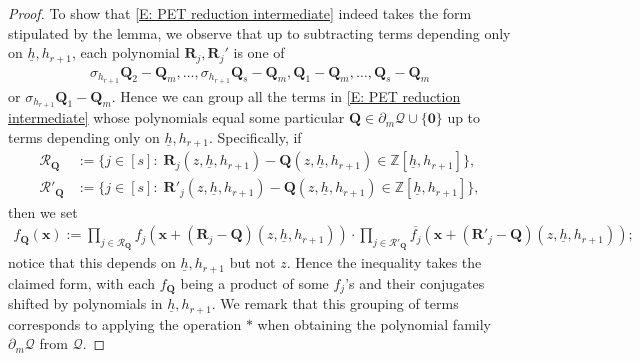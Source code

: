 \documentclass[11pt]{amsart}
\theoremstyle{definition}
\newcommand{\Z}{{\mathbb Z}}
\newcommand{\CQ}{{\mathcal Q}}
\newcommand{\bq}{{\mathbf{Q}}}
\newcommand{\q}{{\mathbf{Q}}}
\newcommand{\bx}{{\mathbf{x}}}
\newcommand{\uh}{{\underline{h}}}
\begin{document}
\begin{proof}
     To show that \eqref{E: PET reduction intermediate} indeed takes the form stipulated by the lemma, we observe that up to subtracting terms depending only on $\uh, h_{r+1}$, each polynomial $\mathbf{R}_j, \mathbf{R}_j'$ is one of
        \begin{align}\label{E: polys after vdC}
            \sigma_{h_{r+1}}{\q}_2-{\q}_m, \ldots, \sigma_{h_{r+1}}{\q}_s - {\q}_m, {\q}_1-{\q}_m, \ldots,  {\q}_s-{\q}_m
        \end{align}
        or $\sigma_{h_{r+1}}{\q}_1-{\q}_m$. Hence we can group all the terms in \eqref{E: PET reduction intermediate} whose polynomials equal some particular $\bq\in\partial_m \CQ\cup\{\mathbf{0}\}$ up to terms depending only on $\uh, h_{r+1}$. Specifically, if 
        \begin{align*}
            \mathcal{R}_\bq &:=\{j\in[s]:\; \mathbf{R}_j(z,\uh, h_{r+1}) - \bq(z, \uh, h_{r+1})\in\Z[\uh,h_{r+1}]\},\\
            \mathcal{R}'_\bq &:=\{j\in[s]:\; \mathbf{R}'_j(z,\uh, h_{r+1}) - \bq(z, \uh, h_{r+1})\in\Z[\uh,h_{r+1}]\},
        \end{align*}
        then we set 
        \begin{align*}
            f_\bq(\bx) := \prod_{j\in \mathcal{R}_\bq}f_j(\bx + (\mathbf{R}_j-\bq)(z,\uh, h_{r+1}))\cdot \prod_{j\in \mathcal{R}'_\bq}\overline{f_j}(\bx + (\mathbf{R}'_{j}-\bq)(z, \uh, h_{r+1}));
        \end{align*}
        notice that this depends on $\uh, h_{r+1}$ but not $z$.
        Hence the inequality takes the claimed form, with each $f_\bq$ being a product of some $f_j$'s and their conjugates shifted by polynomials in $\uh, h_{r+1}$. We remark that this grouping of terms corresponds to applying the operation $*$ when obtaining the polynomial family $\partial_m \CQ$ from $\CQ$.


\end{proof}
\end{document}
